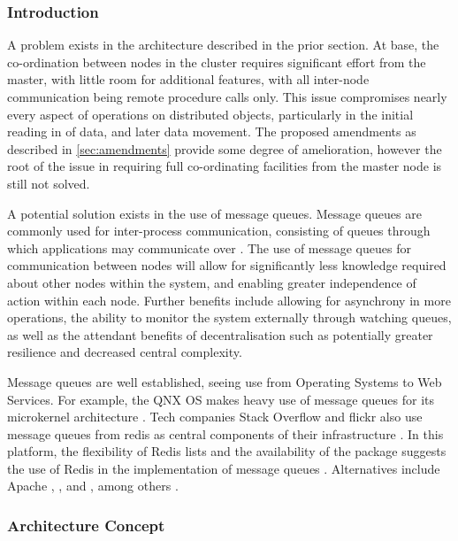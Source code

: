 \subsubsection{Introduction}\label{introduction}

A problem exists in the architecture described in the prior section.
At base, the co-ordination between nodes in the
cluster requires significant effort from the master, with little room
for additional features, with all inter-node communication being remote
procedure calls only. This issue compromises nearly every aspect of
operations on distributed objects, particularly in the initial reading
in of data, and later data movement. The proposed amendments as
described in \cref{sec:amendments} provide some degree of amelioration, however the
root of the issue in requiring full co-ordinating facilities from the
master node is still not solved.

A potential solution exists in the use of message queues. Message queues
are commonly used for inter-process communication, consisting of queues
through which applications may communicate over \cite{curry2004message}.
The use of message queues for communication between nodes will allow for
significantly less knowledge required about other nodes within the
system, and enabling greater independence of action within each node.
Further benefits include allowing for asynchrony in more operations, the
ability to monitor the system externally through watching queues, as
well as the attendant benefits of decentralisation such as potentially
greater resilience and decreased central complexity.

Message queues are well established, seeing use from Operating Systems
to Web Services. For example, the QNX OS makes heavy use of message
queues for its microkernel architecture \cite{hildebrand1992qnx}. Tech
companies Stack Overflow and flickr also use message queues from redis
as central components of their infrastructure \cites{nolan2011flickr,montrose2016stack}. In this platform, the flexibility of Redis lists
and the availability of the  package suggests the use of Redis in
the implementation of message queues \cite{sanfilippo2009redis,urbanek2020rediscc}. Alternatives include Apache , , and
, among others \cites{snyder2011activemq,garg2013kafka,sanfilippo2016disque}.

\subsubsection{Architecture Concept}\label{architecture-concept}

